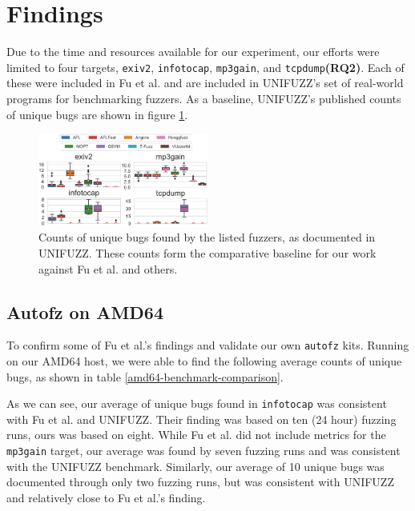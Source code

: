 \section{Findings}

Due to the time and resources available for our experiment, our efforts were limited 
to four targets, \texttt{exiv2}, \texttt{infotocap}, \texttt{mp3gain}, and 
\texttt{tcpdump}\textbf{(RQ2)}. Each of these were included in Fu et al.\cite{fu_autofz_2023} 
and are included in UNIFUZZ's\cite{li_unifuzz_2021} set of real-world programs for 
benchmarking fuzzers. As a baseline, UNIFUZZ's published counts of unique bugs are 
shown in figure \ref{fig:unifuzz_selections}.

\begin{figure}[ht!]
    \includegraphics[width=0.5\textwidth]{figs/unifuzz_selections.png}
    \centering
    \caption{Counts of unique bugs found by the listed fuzzers, as documented in 
    UNIFUZZ\cite{li_unifuzz_2021}. These counts form the comparative baseline for 
    our work against Fu et al.\cite{fu_autofz_2023} and others.}
    \label{fig:unifuzz_selections}
\end{figure}

\subsection{Autofz on AMD64}

To confirm some of Fu et al.'s \cite{fu_autofz_2023} findings and validate our 
own \texttt{autofz} kits. Running on our AMD64 host, we were able to find the following
average counts of unique bugs, as shown in table \ref{amd64-benchmark-comparison}. 

As we can see, our average of unique bugs found in \texttt{infotocap} was consistent 
with Fu et al.\cite{fu_autofz_2023} and UNIFUZZ\cite{li_unifuzz_2021}. Their finding 
was based on ten (24 hour) fuzzing runs, ours was based on eight. While Fu et al. did 
not include metrics for the \texttt{mp3gain} target, our average was found by seven  
fuzzing runs and was consistent with the UNIFUZZ benchmark. Similarly, our average 
of 10 unique bugs was documented through only two fuzzing runs, but was consistent 
with UNIFUZZ and relatively close to Fu et al.'s finding.

